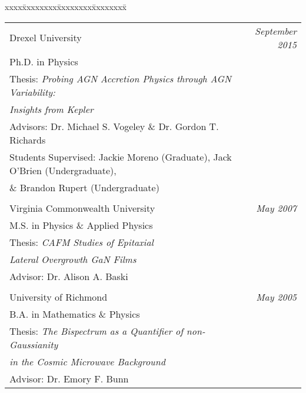 \documentclass[10pt,a4]{article}
\begin{document}
\begin{tabbing}
xxxx\=xxxxxxxx\=xxxxxxxx\=xxxxxxxx\=\kill
\>\begin{tabular*}{0.9\linewidth}{l@{\extracolsep{\fill}}r}

Drexel University & {\it September 2015} \\
Ph.D. in Physics  & \\
Thesis: \it{Probing AGN Accretion Physics through AGN Variability:} \\
\hspace{1.1cm} \it{Insights from Kepler} \\
Advisors: Dr. Michael S. Vogeley \& Dr. Gordon T. Richards \\
Students Supervised: Jackie Moreno (Graduate), Jack O'Brien (Undergraduate), \\
\hspace{3.3cm} \& Brandon Rupert (Undergraduate) \\
 & \\

Virginia Commonwealth University & {\it May 2007} \\
M.S. in Physics \& Applied Physics & \\
Thesis: \it{CAFM Studies of Epitaxial} \\
\hspace{1.1cm} \it{Lateral Overgrowth GaN Films} \\
Advisor: Dr. Alison A. Baski \\
 & \\

University of Richmond & {\it May 2005} \\
B.A. in Mathematics \& Physics  & \\
Thesis: \it{The Bispectrum as a Quantifier of non-Gaussianity} \\
\hspace{1.1cm} \it{in the Cosmic Microwave 	Background} \\
Advisor: Dr. Emory F. Bunn \\

\end{tabular*}
\end{tabbing}
\end{document}
